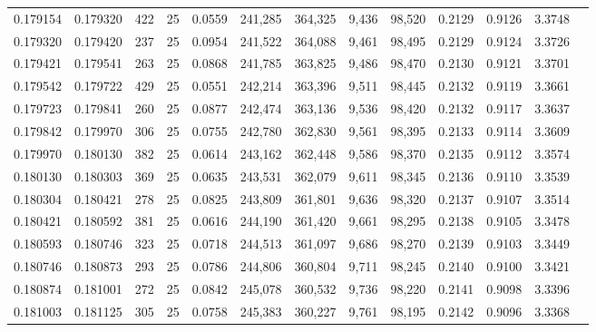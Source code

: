 \begin{tabular}{rrrrrrrrrrrrr}
0.179154 & 0.179320 &   422 &  25 &                                     0.0559 & 241,285 & 364,325 &   9,436 &  98,520 & 0.2129 & 0.9126 & 3.3748 \\
0.179320 & 0.179420 &   237 &  25 &                                     0.0954 & 241,522 & 364,088 &   9,461 &  98,495 & 0.2129 & 0.9124 & 3.3726 \\
0.179421 & 0.179541 &   263 &  25 &                                     0.0868 & 241,785 & 363,825 &   9,486 &  98,470 & 0.2130 & 0.9121 & 3.3701 \\
0.179542 & 0.179722 &   429 &  25 &                                     0.0551 & 242,214 & 363,396 &   9,511 &  98,445 & 0.2132 & 0.9119 & 3.3661 \\
0.179723 & 0.179841 &   260 &  25 &                                     0.0877 & 242,474 & 363,136 &   9,536 &  98,420 & 0.2132 & 0.9117 & 3.3637 \\
0.179842 & 0.179970 &   306 &  25 &                                     0.0755 & 242,780 & 362,830 &   9,561 &  98,395 & 0.2133 & 0.9114 & 3.3609 \\
0.179970 & 0.180130 &   382 &  25 &                                     0.0614 & 243,162 & 362,448 &   9,586 &  98,370 & 0.2135 & 0.9112 & 3.3574 \\
0.180130 & 0.180303 &   369 &  25 &                                     0.0635 & 243,531 & 362,079 &   9,611 &  98,345 & 0.2136 & 0.9110 & 3.3539 \\
0.180304 & 0.180421 &   278 &  25 &                                     0.0825 & 243,809 & 361,801 &   9,636 &  98,320 & 0.2137 & 0.9107 & 3.3514 \\
0.180421 & 0.180592 &   381 &  25 &                                     0.0616 & 244,190 & 361,420 &   9,661 &  98,295 & 0.2138 & 0.9105 & 3.3478 \\
0.180593 & 0.180746 &   323 &  25 &                                     0.0718 & 244,513 & 361,097 &   9,686 &  98,270 & 0.2139 & 0.9103 & 3.3449 \\
0.180746 & 0.180873 &   293 &  25 &                                     0.0786 & 244,806 & 360,804 &   9,711 &  98,245 & 0.2140 & 0.9100 & 3.3421 \\
0.180874 & 0.181001 &   272 &  25 &                                     0.0842 & 245,078 & 360,532 &   9,736 &  98,220 & 0.2141 & 0.9098 & 3.3396 \\
0.181003 & 0.181125 &   305 &  25 &                                     0.0758 & 245,383 & 360,227 &   9,761 &  98,195 & 0.2142 & 0.9096 & 3.3368 \\

\end{tabular}
